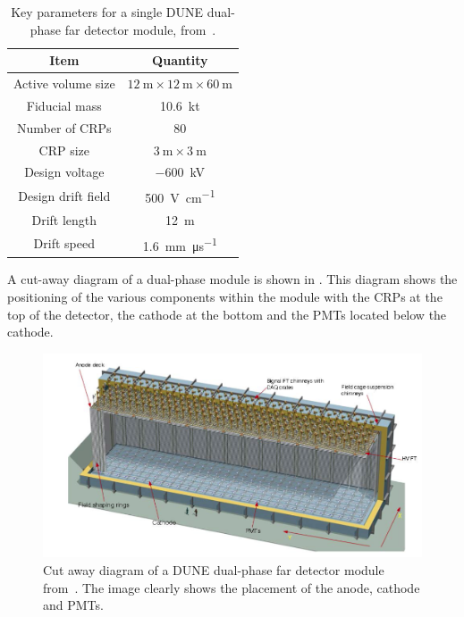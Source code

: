 \begin{table}
  \caption[Key parameters for a single DUNE dual-phase far detector module.]{Key parameters for a single DUNE dual-phase far detector module, from~\cite{idrVol3}.}
  \label{tab:dpStats}
  \centering
  \begin{tabular}{c c}
    \hline
    \hline
    Item & Quantity \\
    \hline
    Active volume size & $\SI{12}{\metre} \times \SI{12}{\metre} \times \SI{60}{\metre}$ \\
    Fiducial mass & \SI{10.6}{\kilo\tonne} \\
    Number of CRPs & 80 \\
    CRP size & $\SI{3}{\metre} \times \SI{3}{\metre}$ \\
    Design voltage & \SI{-600}{\kilo\volt} \\
    Design drift field & \SI{500}{\volt\per\centi\metre} \\
    Drift length & \SI{12}{\metre} \\
    Drift speed & \SI{1.6}{\milli\metre\per\micro\second} \\
    \hline
  \end{tabular}
\end{table}

A cut-away diagram of a dual-phase module is shown in .
This diagram shows the positioning of the various components within the module with the CRPs at the top of the detector, the cathode at the bottom and the PMTs located below the cathode. 

\begin{figure}[h]
  \centering
  \includegraphics[width=.75\linewidth]{files/figures/dune_detector/DUNE-dp}
  \caption[Diagram of a DUNE dual-phase far detector module.]{Cut away diagram of a DUNE dual-phase far detector module from~\cite{idrVol3}. The image clearly shows the placement of the anode, cathode and PMTs.}
  \label{fig:duneDualPhase}
\end{figure}

